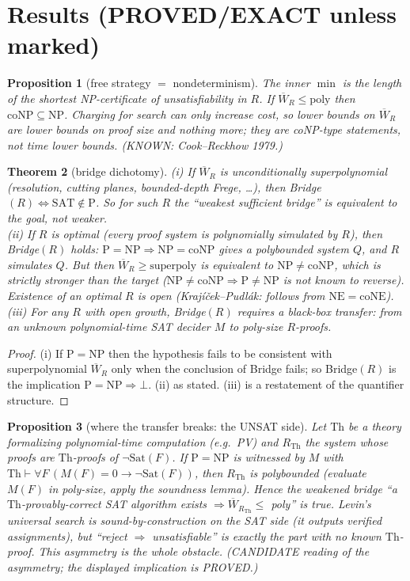 \documentclass{article}
\newtheorem{thm}{Theorem}\newtheorem{prop}[thm]{Proposition}\newtheorem{cor}[thm]{Corollary}
\begin{document}
\section*{Results (PROVED/EXACT unless marked)}
\begin{prop}[free strategy $=$ nondeterminism]
The inner $\min$ is the length of the shortest NP-certificate of unsatisfiability in $R$. If $\overline W_R\le\mathrm{poly}$ then $\mathrm{coNP}\subseteq\mathrm{NP}$. Charging for search can only increase cost, so lower bounds on $\overline W_R$ are lower bounds on proof size and nothing more; they are coNP-type statements, not time lower bounds. (KNOWN: Cook--Reckhow 1979.)
\end{prop}
\begin{thm}[bridge dichotomy]
(i) If $\overline W_R$ is unconditionally superpolynomial (resolution, cutting planes, bounded-depth Frege, \dots), then Bridge$(R)\iff\mathrm{SAT}\notin\mathrm P$. So for such $R$ the ``weakest sufficient bridge'' is \emph{equivalent} to the goal, not weaker.\\
(ii) If $R$ is optimal (every proof system is polynomially simulated by $R$), then Bridge$(R)$ holds: $\mathrm P=\mathrm{NP}\Rightarrow\mathrm{NP}=\mathrm{coNP}$ gives a polybounded system $Q$, and $R$ simulates $Q$. But then $\overline W_R\ge\mathrm{superpoly}$ is equivalent to $\mathrm{NP}\ne\mathrm{coNP}$, which is strictly stronger than the target ($\mathrm{NP}\neq\mathrm{coNP}\Rightarrow\mathrm P\ne\mathrm{NP}$ is not known to reverse). Existence of an optimal $R$ is open (Krajíček--Pudlák: follows from $\mathrm{NE}=\mathrm{coNE}$).\\
(iii) For any $R$ with open growth, Bridge$(R)$ requires a black-box transfer: from an \emph{unknown} polynomial-time SAT decider $M$ to poly-size $R$-proofs.
\end{thm}
\begin{proof}
(i) If $\mathrm P=\mathrm{NP}$ then the hypothesis fails to be consistent with superpolynomial $\overline W_R$ only when the conclusion of Bridge fails; so Bridge$(R)$ is the implication $\mathrm P=\mathrm{NP}\Rightarrow\bot$. (ii) as stated. (iii) is a restatement of the quantifier structure.
\end{proof}
\begin{prop}[where the transfer breaks: the UNSAT side]
Let $\mathrm{Th}$ be a theory formalizing polynomial-time computation (e.g.\ PV) and $R_{\mathrm{Th}}$ the system whose proofs are $\mathrm{Th}$-proofs of $\neg\mathrm{Sat}(F)$. If $\mathrm P=\mathrm{NP}$ is witnessed by $M$ with $\mathrm{Th}\vdash\forall F\,(M(F)=0\to\neg\mathrm{Sat}(F))$, then $R_{\mathrm{Th}}$ is polybounded (evaluate $M(F)$ in poly-size, apply the soundness lemma). Hence the weakened bridge
``a $\mathrm{Th}$-provably-correct SAT algorithm exists $\Rightarrow\overline W_{R_{\mathrm{Th}}}\le$ poly'' is true. Levin's universal search is sound-by-construction on the SAT side (it outputs verified assignments), but ``reject $\Rightarrow$ unsatisfiable'' is exactly the part with no known $\mathrm{Th}$-proof. This asymmetry is the whole obstacle. (CANDIDATE reading of the asymmetry; the displayed implication is PROVED.)
\end{prop}
\end{document}
